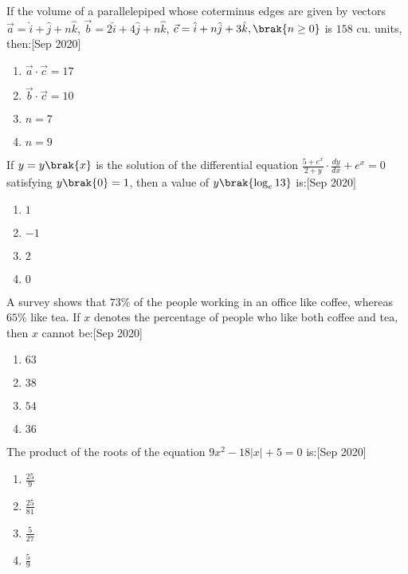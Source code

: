     \item If the volume of a parallelepiped whose coterminus edges are given by vectors $\vec{a} = \hat{i} + \hat{j} + n \hat{k}$, $\vec{b} = 2 \hat{i} + 4 \hat{j} + n \hat{k}$, $\vec{c} = \hat{i} + n \hat{j} + 3 \hat{k}, \brak{n \geq 0}$ is $158$ cu. units, then:\hfill{[Sep 2020]}
    \begin{enumerate}
        \item $\vec{a} \cdot \vec{c} = 17$
        \item $\vec{b} \cdot \vec{c} = 10$
        \item $n = 7$
        \item $n = 9$
    \end{enumerate}

    \item If $y = y\brak{x}$ is the solution of the differential equation $\frac{5 + e^x}{2+y} \cdot \frac{dy}{dx} + e^x = 0$ satisfying $y\brak{0} = 1$, then a value of $y\brak{\log_e 13}$ is:\hfill{[Sep 2020]}
    \begin{enumerate}
        \item $1$
        \item $-1$
        \item $2$
        \item $0$
    \end{enumerate}

    \item A survey shows that $73\%$ of the people working in an office like coffee, whereas $65\%$ like tea. If $x$ denotes the percentage of people who like both coffee and tea, then $x$ cannot be:\hfill{[Sep 2020]}
    \begin{enumerate}
        \item $63$
        \item $38$
        \item $54$
        \item $36$
    \end{enumerate}

    \item The product of the roots of the equation $9x^2 - 18|x| + 5 = 0$ is:\hfill{[Sep 2020]}
    \begin{enumerate}
        \item $\frac{25}{9}$
        \item $\frac{25}{81}$
        \item $\frac{5}{27}$
        \item $\frac{5}{9}$
    \end{enumerate}

